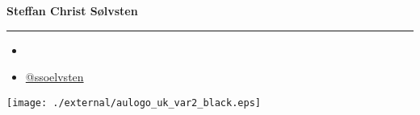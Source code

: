 \documentclass[english, aspectratio=169]{beamer}
\begin{document}
\begin{frame}{}

  {\Large \textbf{Steffan Christ Sølvsten}}
  {\hrule width0.5\linewidth}

  \vspace{5pt}

  \begin{itemize}
  \item[\faIcon{envelope}] 
  \item[\faIcon{twitter}] \href{https://www.twitter.com/ssoelvsten}{@ssoelvsten}
  \end{itemize}

  \vspace{20pt}

  \texttt{[image: ./external/aulogo\_uk\_var2\_black.eps]}
\end{frame}
\end{document}
